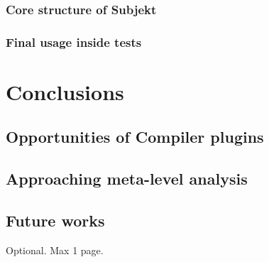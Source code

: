 \documentclass[12pt,a4paper,openright,twoside]{book}
\begin{document}
\subsection{Core structure of Subjekt}

\subsection{Final usage inside tests}

\chapter{Conclusions}
\label{chap:conclusion}

\section{Opportunities of Compiler plugins}

\section{Approaching meta-level analysis}

\section{Future works}


\backmatter

\nocite{*} %




\begin{acknowledgements} %
Optional. Max 1 page.
\end{acknowledgements}
\end{document}
